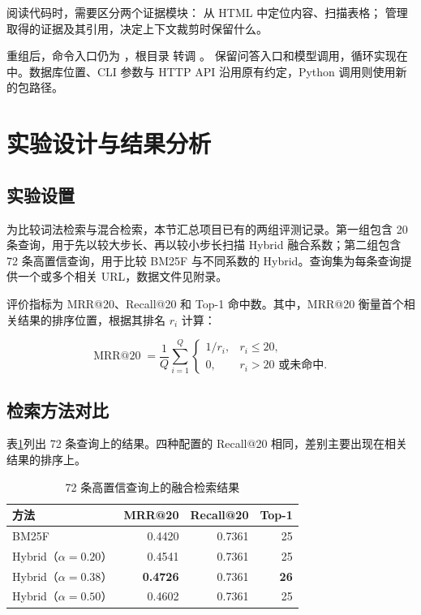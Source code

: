 \documentclass[UTF8,zihao=-4,fontset=fandol]{ctexart}
\begin{document}
阅读代码时，需要区分两个证据模块： 从 HTML 中定位内容、扫描表格； 管理取得的证据及其引用，决定上下文裁剪时保留什么。

重组后，命令入口仍为 ，根目录  转调 。 保留问答入口和模型调用，循环实现在  中。数据库位置、CLI 参数与 HTTP API 沿用原有约定，Python 调用则使用新的包路径。

\section{实验设计与结果分析}

\subsection{实验设置}

为比较词法检索与混合检索，本节汇总项目已有的两组评测记录。第一组包含 20 条查询，用于先以较大步长、再以较小步长扫描 Hybrid 融合系数；第二组包含 72 条高置信查询，用于比较 BM25F 与不同系数的 Hybrid。查询集为每条查询提供一个或多个相关 URL，数据文件见附录。

评价指标为 MRR@20、Recall@20 和 Top-1 命中数。其中，MRR@20 衡量首个相关结果的排序位置，根据其排名 $r_i$ 计算：

\begin{equation}
\operatorname{MRR@20}=\frac{1}{Q}\sum_{i=1}^{Q}
\begin{cases}
1/r_i,& r_i\leq20,\\
0,& r_i>20\text{ 或未命中}.
\end{cases}
\label{eq:mrr}
\end{equation}

\subsection{检索方法对比}

表\ref{tab:retrieval-results}列出 72 条查询上的结果。四种配置的 Recall@20 相同，差别主要出现在相关结果的排序上。

\begin{table}[H]
\centering
\caption{72 条高置信查询上的融合检索结果}
\label{tab:retrieval-results}
\begin{tabular}{lrrr}
\toprule
方法 & MRR@20 & Recall@20 & Top-1 \\
\midrule
BM25F & 0.4420 & 0.7361 & 25 \\
Hybrid（$\alpha=0.20$） & 0.4541 & 0.7361 & 25 \\
Hybrid（$\alpha=0.38$） & \textbf{0.4726} & 0.7361 & \textbf{26} \\
Hybrid（$\alpha=0.50$） & 0.4602 & 0.7361 & 25 \\
\bottomrule
\end{tabular}
\end{table}
\end{document}
